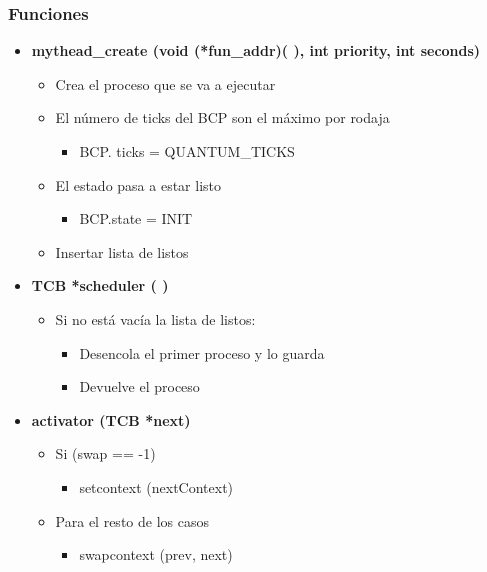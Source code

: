 \documentclass[10pt, spanish, pdftex]{template/UC3M_document}
\begin{document}
\subsubsection{Funciones}
\begin{itemize}
    \item \textbf{mythead\_create (void (*fun\_addr)( ), int priority, int seconds)}
    \begin{itemize}
        \item Crea el proceso que se va a ejecutar
        \item El número de ticks del BCP son el máximo por rodaja
        \begin{itemize}
            \item BCP. ticks = QUANTUM\_TICKS
        \end{itemize}
        \item El estado pasa a estar listo
        \begin{itemize}
            \item BCP.state = INIT
        \end{itemize}
        \item Insertar lista de listos
    \end{itemize}
    
    \item \textbf{TCB *scheduler ( )}
    \begin{itemize}
        \item Si no está vacía la lista de listos:
        \begin{itemize}
            \item Desencola el primer proceso y lo guarda 
            \item Devuelve el proceso
        \end{itemize}
    \end{itemize}
    
    \item \textbf{activator (TCB *next)}
    \begin{itemize}
        \item Si (swap == -1)
        \begin{itemize}
            \item setcontext (nextContext)
        \end{itemize}
        \item Para el resto de los casos
        \begin{itemize}
            \item swapcontext (prev, next)
        \end{itemize}
    \end{itemize}
    

\end{itemize}
\end{document}
